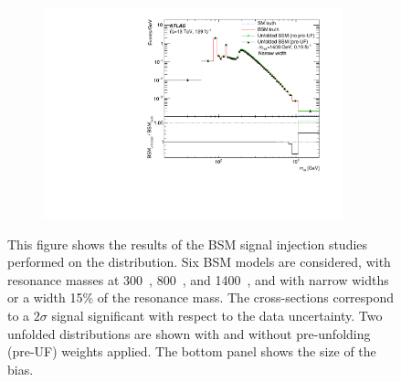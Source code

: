 \begin{figure}[htb]
    \begin{subfigure}{.49\textwidth}\centering\includegraphics[width = 0.95\textwidth]{Figures/m4l/InjectionTests/0dot19fb_1400NW_injection.pdf}\caption{}\label{fig:injection_0dot19fb_1400NW}\end{subfigure}
    \caption{This figure shows the results of the BSM signal injection studies performed on the \mFourL{} distribution. Six BSM models are considered, with resonance masses at 300~\GeV, 800~\GeV, and 1400~\GeV, and with narrow widths or a width 15\% of the resonance mass. The cross-sections correspond to a $2\sigma$ signal significant with respect to the data uncertainty. Two unfolded distributions are shown with and without pre-unfolding (pre-UF) weights applied. The bottom panel shows the size of the bias.}
    \label{fig:m4l:injection}
\end{figure}
